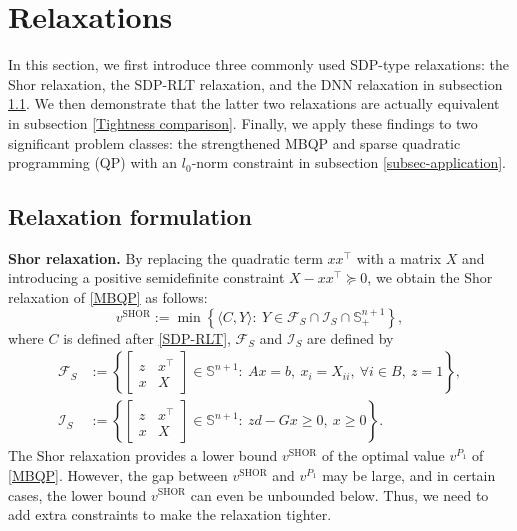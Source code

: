 \documentclass[11pt]{article}
\theoremstyle{plain}
\def\<{\big\langle}
\def\>{\big\rangle}
\def\F{\mathcal{F}}
\def\I{\mathcal{I}}
\def\tb#1{\textbf{#1}}
\begin{document}
\section{Relaxations}\label{sec-relaxations}

In this section, we first introduce three commonly used SDP-type relaxations: the Shor relaxation, the SDP-RLT relaxation, and the DNN relaxation in subsection \ref{subsec-relaxation}. 
We then demonstrate that the latter two relaxations are actually equivalent 
in subsection \ref{Tightness comparison}. Finally, we apply these findings to two significant problem classes: the strengthened MBQP and sparse quadratic programming (QP) with an $l_0$-norm constraint
in subsection \ref{subsec-application}.



\subsection{Relaxation formulation}
\label{subsec-relaxation}

\noindent\tb{Shor relaxation.}
By replacing the quadratic term $xx^\top$ with a matrix $X$ and introducing a positive semidefinite constraint $X-xx^\top\succeq 0$, we obtain the Shor relaxation \cite{shor1990dual} of \eqref{MBQP} as follows:
%
\begin{equation}\label{SHOR}
    v^{\text{SHOR}}:=\min\left\{  
    \<C,Y\> :\  
    Y\in\F_S\cap\I_S\cap\mathbb{S}_{+}^{n+1}
    \right\},\tag{SHOR}
\end{equation}
where $C$ is defined after \eqref{SDP-RLT}, $\F_S$ and $\I_{S}$ are defined by
%
\begin{align*}
\F_S&:= \left\{\begin{bmatrix}z& x^\top \\ x & X\end{bmatrix}\in  \mathbb{S}^{n+1} :\  Ax=b,\ x_i =X_{ii}, \  \forall i \in B,\ z=1\right\},\\
\I_S&:= \left\{\begin{bmatrix}z& x^\top \\ x & X\end{bmatrix}\in  \mathbb{S}^{n+1} :\ zd-Gx\geq 0,\ x\geq 0 \right\}.
\end{align*}
% 
The Shor relaxation provides a lower bound $v^{\text{SHOR}}$ of the optimal value $v^{P_1}$ of \eqref{MBQP}. However, the gap between $v^{\text{SHOR}}$ and $v^{P_1}$ may be large, and in certain cases, the lower bound $v^{\text{SHOR}}$ can even be unbounded below. Thus, we need to add extra constraints to make the relaxation tighter.
\end{document}
